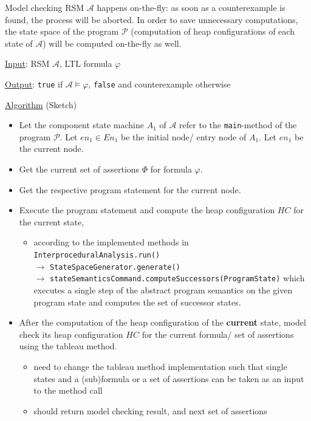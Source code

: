 \documentclass[a4paper,12pt]{article}
\begin{document}
Model checking RSM $\mathcal{A}$ happens on-the-fly: as soon as a counterexample is found, the process will be aborted. 
In order to save unnecessary computations, the state space of the program $\mathcal{P}$ (computation of heap configurations of each state of $\mathcal{A}$) will be computed on-the-fly as well.

\underline{Input}: RSM $\mathcal{A}$, LTL formula $\varphi$

\underline{Output}: \texttt{true} if $\mathcal{A} \models \varphi$, \texttt{false} and counterexample otherwise

\underline{Algorithm} (Sketch)
\begin{itemize}
	\item Let the component state machine $A_1$ of $\mathcal{A}$ refer to the \texttt{main}-method of the program $\mathcal{P}$. Let $en_1 \in En_1$ be the initial node/ entry node of $A_1$. Let $en_1$ be the current node.
	\item Get the current set of assertions $\Phi$ for formula $\varphi$.
	\item Get the respective program statement for the current node.
	\item Execute the program statement and compute the heap configuration $HC$ for the current state, 
	\begin{itemize}
		\item according to the implemented methods in \\ \texttt{InterproceduralAnalysis.run()} \\
		$\rightarrow$ \texttt{StateSpaceGenerator.generate()}\\
		$\rightarrow$ \texttt{stateSemanticsCommand.computeSuccessors(ProgramState)} which executes a single step of the abstract program semantics on the given program state and computes the set of successor states.
	\end{itemize}
	\item After the computation of the heap configuration of the \textbf{current} state, model check its heap configuration $HC$ for the current formula/ set of assertions using the tableau method.
	\begin{itemize}
		\item need to change the tableau method implementation such that single states and a (sub)formula or a set of assertions can be taken as an input to the method call
		\item should return model checking result, and next set of assertions
	\end{itemize}

\end{itemize}
\end{document}
